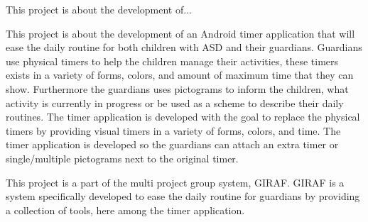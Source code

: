 This project is about the development of...

This project is about the development of an Android timer application that will ease the daily routine for both children with ASD and their guardians. Guardians use physical timers to help the children manage their activities, these timers exists in a variety of forms, colors, and amount of maximum time that they can show. Furthermore the guardians uses pictograms to inform the children, what activity is currently in progress or be used as a scheme to describe their daily routines. The timer application is developed with the goal to replace the physical timers by providing visual timers in a variety of forms, colors, and time. The timer application is developed so the guardians can attach an extra timer or single/multiple pictograms next to the original timer.

This project is a part of the multi project group system, GIRAF. GIRAF is a system specifically developed to ease the daily routine for guardians by providing a collection of tools, here among the timer application.